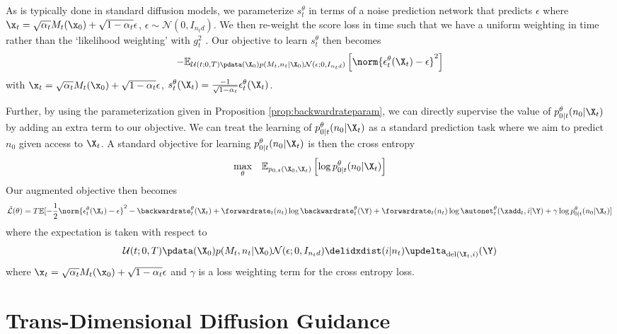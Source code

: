 As is typically done in standard diffusion models, we parameterize $s_t^\theta$ in terms of a noise prediction network that predicts $\epsilon$ where $\x_t = \sqrt{\alpha_t}M_t(\x_0) + \sqrt{1- \alpha_t} \epsilon$, $\epsilon \sim \mathcal{N}(0, I_{n_t d})$. We then re-weight the score loss in time such that we have a uniform weighting in time rather than the `likelihood weighting' with $g_t^2$ \cite{song2020score, song2021maximum}. Our objective to learn $s_t^\theta$ then becomes
\begin{equation}
    - \mathbb{E}_{\mathcal{U}(t; 0, T) \pdata(\X_0) p(M_t, n_t | \X_0) \mathcal{N}(\epsilon; 0, I_{n_t d})} \left[ \norm{\epsilon_t^\theta(\X_t) - \epsilon}^2 \right]
\end{equation}
with $\x_t = \sqrt{\alpha_t} M_t(\x_0) + \sqrt{1 - \alpha_t} \epsilon$, $s_t^\theta(\X_t) = \frac{-1}{\sqrt{1-\alpha_t}} \epsilon_t^\theta(\X_t)$.

Further, by using the parameterization given in Proposition \ref{prop:backwardrateparam}, we can directly supervise the value of $p_{0|t}^\theta(n_0 | \X_t)$ by adding an extra term to our objective. We can treat the learning of $p_{0|t}^\theta(n_0 | \X_t)$ as a standard prediction task where we aim to predict $n_0$ given access to $\X_t$. A standard objective for learning $p_{0|t}^\theta(n_0 | \X_t)$ is then the cross entropy
\begin{equation}
    \underset{\theta}{\text{max}} \quad \mathbb{E}_{p_{0,t}(\X_0, \X_t)} \left[ \log p_{0|t}^{\theta}(n_0 | \X_t) \right] 
\end{equation}
Our augmented objective then becomes
\begin{equation}
    \tilde{\mathcal{L}}(\theta) = T\mathbb{E} [ -\frac{1}{2}\norm{\epsilon_t^\theta(\X_t) - \epsilon}^2 - \backwardrate_t^\theta(\X_t) + \forwardrate_t(n_t) \log \backwardrate_t^\theta(\Y) + \forwardrate_t(n_t) \log \autonet_t^\theta(\xadd_t, i | \Y) + \gamma \log p_{0|t}^\theta (n_0 | \X_t) ]
    \label{eq:augmentedObjective}
\end{equation}
where the expectation is taken with respect to 
\begin{equation}
\mathcal{U}(t; 0, T) \pdata(\X_0) p(M_t, n_t | \X_0) \mathcal{N}(\epsilon; 0, I_{n_t d}) \delidxdist(i | n_t) \updelta_{\text{del}(\X_t, i)}(\Y)
\end{equation}
where $\x_t = \sqrt{\alpha_t} M_t(\x_0) + \sqrt{1 - \alpha_t} \epsilon$ and $\gamma$ is a loss weighting term for the cross entropy loss.


\section{Trans-Dimensional Diffusion Guidance}
\label{sec:tddm-ApdxDiffGuide}

